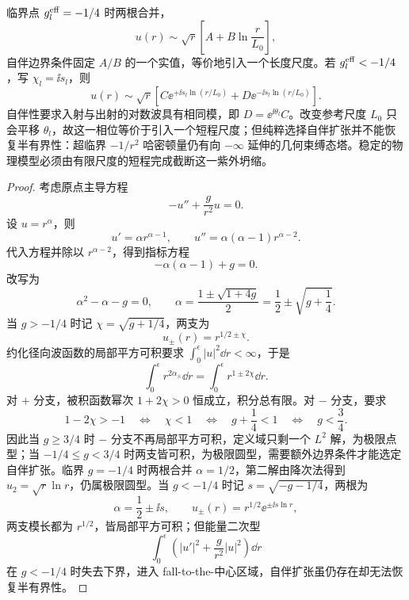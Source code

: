 临界点 $g_l^{\rm eff}=-1/4$ 时两根合并，
\[
u(r)\sim\sqrt r\left[A+B\ln\frac r{L_0}\right],
\]
自伴边界条件固定 $A/B$ 的一个实值，等价地引入一个长度尺度。若 $g_l^{\rm eff}<-1/4$，写 $\chi_l=\ii s_l$，则
\[
u(r)\sim\sqrt r\left[
C\ee^{+\ii s_l\ln(r/L_0)}
+D\ee^{-\ii s_l\ln(r/L_0)}
\right].
\]
自伴性要求入射与出射的对数波具有相同模，即 $D=\ee^{\ii\theta_l}C$。改变参考尺度 $L_0$ 只会平移 $\theta_l$，故这一相位等价于引入一个短程尺度；但纯粹选择自伴扩张并不能恢复半有界性：超临界 $-1/r^2$ 哈密顿量仍有向 $-\infty$ 延伸的几何束缚态塔。稳定的物理模型必须由有限尺度的短程完成截断这一紫外坍缩。

\begin{proof}
考虑原点主导方程
\begin{equation*}
 -u''+\frac g{r^2}u=0.
\end{equation*}
设 $u=r^\alpha$，则
\begin{equation*}
 u'=\alpha r^{\alpha-1},
 \qquad
 u''=\alpha(\alpha-1)r^{\alpha-2}.
\end{equation*}
代入方程并除以 $r^{\alpha-2}$，得到指标方程
\begin{equation*}
 -\alpha(\alpha-1)+g=0.
\end{equation*}
改写为
\begin{equation*}
 \alpha^2-\alpha-g=0,
 \qquad
 \alpha=\frac{1\pm\sqrt{1+4g}}2
 =\frac12\pm\sqrt{g+\frac14}.
\end{equation*}
当 $g>-1/4$ 时记 $\chi=\sqrt{g+1/4}$，两支为
\begin{equation*}
 u_\pm(r)=r^{1/2\pm\chi}.
\end{equation*}
约化径向波函数的局部平方可积要求 $\int_0^\epsilon|u|^2\dd r<\infty$，于是
\begin{equation*}
 \int_0^\epsilon r^{2\alpha_\pm}\dd r
 =\int_0^\epsilon r^{1\pm2\chi}\dd r.
\end{equation*}
对 $+$ 分支，被积函数幂次 $1+2\chi>0$ 恒成立，积分总有限。对 $-$ 分支，要求
\begin{equation*}
 1-2\chi>-1
 \quad\Longleftrightarrow\quad
 \chi<1
 \quad\Longleftrightarrow\quad
 g+\frac14<1
 \quad\Longleftrightarrow\quad
 g<\frac34.
\end{equation*}
因此当 $g\ge3/4$ 时 $-$ 分支不再局部平方可积，定义域只剩一个 $L^2$ 解，为极限点型；当 $-1/4\le g<3/4$ 时两支皆可积，为极限圆型，需要额外边界条件才能选定自伴扩张。临界 $g=-1/4$ 时两根合并 $\alpha=1/2$，第二解由降次法得到 $u_2=\sqrt r\ln r$，仍属极限圆型。当 $g<-1/4$ 时记 $s=\sqrt{-g-1/4}$，两根为
\begin{equation*}
 \alpha=\frac12\pm\ii s,
 \qquad
 u_\pm(r)=r^{1/2}\ee^{\pm\ii s\ln r},
\end{equation*}
两支模长都为 $r^{1/2}$，皆局部平方可积；但能量二次型
\begin{equation*}
 \int_0^\epsilon\!\left(|u'|^2+\frac g{r^2}|u|^2\right)\dd r
\end{equation*}
在 $g<-1/4$ 时失去下界，进入 fall-to-the-中心区域，自伴扩张虽仍存在却无法恢复半有界性。
\end{proof}


